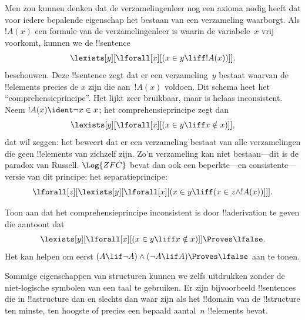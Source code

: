 \documentclass[openany]{memoir}
\begin{document}
Men zou kunnen denken dat de verzamelingenleer nog een axioma nodig
heeft dat voor iedere bepalende eigenschap het bestaan van een
verzameling waarborgt. Als $!A(x)$ een formule van de
verzamelingenleer is waarin de variabele~$x$ vrij voorkomt, kunnen we
de !!{sentence}
\[
\lexists[y][\lforall[x][(x \in y \liff !A(x))]].
\]
beschouwen. Deze !!{sentence} zegt dat er een verzameling~$y$ bestaat
waarvan de !!{element}s precies de $x$ zijn die aan~$!A(x)$ voldoen.
Dit schema heet het ``comprehensieprincipe''. Het lijkt zeer bruikbaar,
maar is helaas inconsistent. Neem $!A(x) \ident \lnot x \in x$; het
comprehensieprincipe zegt dan
\[
\lexists[y][\lforall[x][(x \in y \liff x \notin x)]],
\]
dat wil zeggen: het beweert dat er een verzameling bestaat van alle
verzamelingen die geen !!{element}s van zichzelf zijn. Zo'n verzameling
kan niet bestaan---dit is de paradox van Russell. $\Log{ZFC}$ bevat
dan ook een beperkte---en consistente---versie van dit principe: het
separatieprincipe:
\[
\lforall[z][\lexists[y][\lforall[x][(x \in y \liff (x \in z \land
      !A(x))]]].
\]

\begin{prob}
Toon aan dat het comprehensieprincipe inconsistent is door
!!a{derivation} te geven die aantoont dat
\[
\lexists[y][\lforall[x][(x \in y \liff x \notin x)]] \Proves \lfalse.
\]
Het kan helpen om eerst $(A \lif \lnot A) \land (\lnot A \lif A)
\Proves \lfalse$ aan te tonen.
\end{prob}
\endgroup

\begingroup
\def\olfilename{OLP-0173}
\def\olfilepath{content/first-order-logic/models-theories/}
\hypertarget{unit-OLP-0173}{}





\begin{explain}
Sommige eigenschappen van structuren kunnen we zelfs uitdrukken zonder
de niet-logische symbolen van een taal te gebruiken. Er zijn
bijvoorbeeld !!{sentence}s die in !!a{structure} dan en slechts dan
waar zijn als het !!{domain} van de !!{structure} ten minste, ten
hoogste of precies een bepaald aantal~$n$ !!{element}s bevat.
\end{explain}
\end{document}
